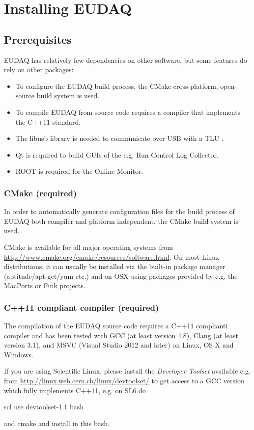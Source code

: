 \section{Installing EUDAQ}

\subsection{Prerequisites}

EUDAQ has relatively few dependencies on other software, but some features do rely on other packages:
\begin{itemize}
\item To configure the EUDAQ build process, the CMake cross-platform, open-source build system is used.
\item To compile EUDAQ from source code requires a compiler that implements the C++11 standard.
\item The libusb library is needed to communicate over USB with a \gls{TLU} \cite{Cussans2009}.
\item Qt is required to build GUIs of the e.g. Run Control Log Collector. 
\item ROOT is required for the Online Monitor.
\end{itemize}

\subsubsection{CMake (required)}
In order to automatically generate configuration files for the build process of EUDAQ both compiler and platform independent, the CMake build system is used.

CMake is available for all major operating systems from \url{http://www.cmake.org/cmake/resources/software.html}. On most Linux distributions, it can usually be installed via the built-in package manager (aptitude/apt-get/yum etc.) and on OSX using packages provided by e.g. the MacPorts or Fink projects.

\subsubsection{C++11 compliant compiler (required)}
The compilation of the EUDAQ source code requires a C++11 complianti compiler and has been tested with GCC (at least version 4.8), Clang (at least version 3.1), and MSVC (Visual Studio 2012 and later) on Linux, OS X and Windows.

If you are using Scientific Linux, please install the \emph{Developer Toolset} available e.g. from \url{http://linux.web.cern.ch/linux/devtoolset/} to get access to a GCC version which fully implements C++11, e.g. on SL6 do
\begin{listing}[mybash]
scl use devtoolset-1.1 bash
\end{listing}
and cmake and install in this bash.

